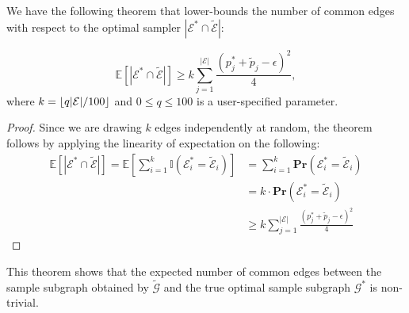 We have the following theorem that lower-bounds the number of common edges with respect to the optimal sampler $|\mathcal{E} ^* \cap \mathcal{\tilde{E}}|$: 
\begin{theorem}
\begin{equation}
\mathbb{E}[|\mathcal{E}^* \cap \mathcal{\tilde{E}}|] \geq k \sum_{j=1}^{|\mathcal{E}|} \frac{(p^*_j + \tilde{p}_j - \epsilon)^2}{4},
\end{equation}
where $k = \lfloor q|\mathcal{E}|/100 \rfloor$ and $0 \leq q \leq 100$ is a user-specified parameter.
\end{theorem}
\begin{proof}
    Since we are drawing $k$ edges independently at random, the theorem follows by applying the linearity of expectation on the following:
\begin{align*}
\mathbb{E}[|\mathcal{E}^* \cap \mathcal{\tilde{E}}|] = \mathbb{E}[\sum_{i=1}^k \mathbb{I}(\mathcal{E}_i^* = \mathcal{\tilde{E}}_i)] &= \sum_{i=1}^k \mathbf{Pr}(\mathcal{E}_i^* = \mathcal{\tilde{E}}_i) \\
& = k\cdot \mathbf{Pr}(\mathcal{E}_i^* = \mathcal{\tilde{E}}_i)\\
& \geq k \sum_{j=1}^{|\mathcal{E}|} \frac{(p^*_j + \tilde{p}_j - \epsilon)^2}{4}
\end{align*}
\end{proof}
This theorem shows that the expected number of common edges between the sample subgraph obtained by \sgs $\mathcal{\tilde{G}}$ and the true optimal sample subgraph $\mathcal{G}^*$ is non-trivial. 



